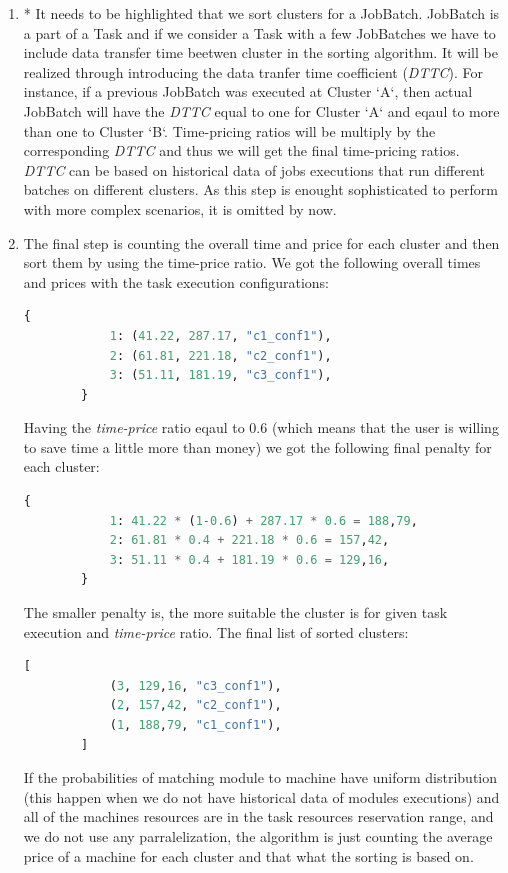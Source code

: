 \documentclass{article}
\begin{document}
\begin{enumerate}
		\item* It needs to be highlighted that we sort clusters for a JobBatch. JobBatch is a part of a Task and if we consider a Task with a few JobBatches we have to include data transfer time beetwen cluster in the sorting algorithm. It will be realized through introducing the data tranfer time coefficient (\textit{DTTC}). For instance, if a previous JobBatch was executed at Cluster `A`, then actual JobBatch will have the \textit{DTTC} equal to one for Cluster `A` and eqaul to more than one to Cluster `B`. Time-pricing ratios will be multiply by the corresponding \textit{DTTC} and thus we will get the final time-pricing ratios. 
		\textit{DTTC} can be based on historical data of jobs executions that run different batches on different clusters. As this step is enought sophisticated to perform with more complex scenarios, it is omitted by now.
		\item The final step is counting the overall time and price for each cluster and then sort them by using the time-price ratio.
		We got the following overall times and prices with the task execution configurations:
		\begin{lstlisting}[language=Python]
		{
			1: (41.22, 287.17, "c1_conf1"),
			2: (61.81, 221.18, "c2_conf1"),
			3: (51.11, 181.19, "c3_conf1"),
		}
		\end{lstlisting}
		Having the \textit{time-price} ratio eqaul to 0.6 (which means that the user is willing to save time a little more than money) we got the following final penalty for each cluster:
		\begin{lstlisting}[language=Python]
		{
			1: 41.22 * (1-0.6) + 287.17 * 0.6 = 188,79,
			2: 61.81 * 0.4 + 221.18 * 0.6 = 157,42,
			3: 51.11 * 0.4 + 181.19 * 0.6 = 129,16,
		}
		\end{lstlisting}
		
		The smaller penalty is, the more suitable the cluster is for given task execution and \textit{time-price} ratio. The final list of sorted clusters:
		
		\begin{lstlisting}[language=Python]
		[
			(3, 129,16, "c3_conf1"),
			(2, 157,42, "c2_conf1"),
			(1, 188,79, "c1_conf1"),
		]
		\end{lstlisting}
		
		If the probabilities of matching module to machine have uniform distribution (this happen when we do not have historical data of modules executions) and all of the machines resources are in the task resources reservation range, and we do not use any parralelization, the algorithm is just counting the average price of a machine for each cluster and that what the sorting is based on.
		
	\end{enumerate}
	
\end{document}

